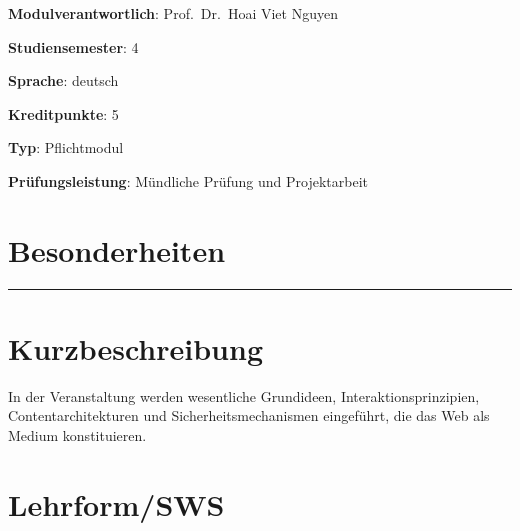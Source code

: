 \begin{modulHead}
\textbf{Modulverantwortlich}: Prof.~Dr.~Hoai Viet
Nguyen
\end{modulHead}
\begin{modulHead}
\textbf{Studiensemester}:
4
\end{modulHead}
\begin{modulHead}
\textbf{Sprache}:
deutsch
\end{modulHead}
\begin{modulHead}
\textbf{Kreditpunkte}:
5
\end{modulHead}
\begin{modulHead}
\textbf{Typ}:
Pflichtmodul
\end{modulHead}
\begin{modulHead}
\textbf{Prüfungsleistung}:
Mündliche Prüfung und Projektarbeit
\end{modulHead}


\hypertarget{besonderheitenpathlabel....srcmodulbeschreibungen-bachelor-bpo5ba_web-development}{%
\section*{Besonderheiten\label{../../src/modulbeschreibungen-bachelor-bpo5/BA_Web-Development}}\label{besonderheitenpathlabel....srcmodulbeschreibungen-bachelor-bpo5ba_web-development}}

\begin{center}\rule{0.5\linewidth}{0.5pt}\end{center}

\hypertarget{kurzbeschreibungpathlabel....srcmodulbeschreibungen-bachelor-bpo5ba_web-development}{%
\section*{Kurzbeschreibung\label{../../src/modulbeschreibungen-bachelor-bpo5/BA_Web-Development}}\label{kurzbeschreibungpathlabel....srcmodulbeschreibungen-bachelor-bpo5ba_web-development}}

In der Veranstaltung werden wesentliche Grundideen,
Interaktionsprinzipien, Contentarchitekturen und Sicherheitsmechanismen
eingeführt, die das Web als Medium konstituieren.

\hypertarget{lehrformswspathlabel....srcmodulbeschreibungen-bachelor-bpo5ba_web-development}{%
\section*{Lehrform/SWS\label{../../src/modulbeschreibungen-bachelor-bpo5/BA_Web-Development}}\label{lehrformswspathlabel....srcmodulbeschreibungen-bachelor-bpo5ba_web-development}}

